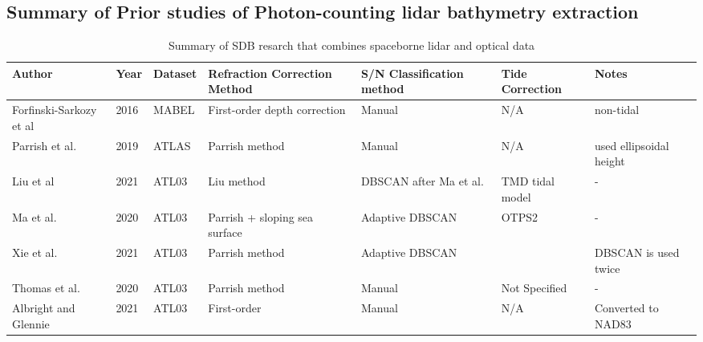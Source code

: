 \subsection{Summary of Prior studies of Photon-counting lidar bathymetry extraction}
\begin{landscape}
      \begin{table}
            \caption{Summary of SDB resarch that combines spaceborne lidar and optical data}
            \begin{tabular}{lllp{3cm}p{3cm}ll}
                  \midrule
                  Author                                               & Year & Dataset & Refraction Correction Method  & S/N Classification method      & Tide Correction & Notes                        \\
                  \hline
                  Forfinski-Sarkozy et al \cite{Forfinski-Sarkozi2016} & 2016 & MABEL   & First-order depth correction  & Manual                         & N/A             & non-tidal                    \\
                  Parrish et al. \cite{Parrish2019}                    & 2019 & ATLAS   & Parrish method                & Manual                         & N/A             & used  ellipsoidal height     \\
                  Liu et al \cite{Liu2021}                             & 2021 & ATL03   & Liu method                    & DBSCAN after Ma et al.         & TMD tidal model & -                            \\
                  Ma et al.  \cite{Ma2020}                             & 2020 & ATL03   & Parrish + sloping sea surface & Adaptive DBSCAN                & OTPS2           & -                            \\
                  Xie et al. \cite{Xie2021}                            & 2021 & ATL03   & Parrish method                & Adaptive DBSCAN                &                 & DBSCAN  is used twice        \\
                  Thomas et al. \cite{Thomas2021d}                     & 2020 & ATL03   & Parrish method                & Manual                         & Not Specified   & -                            \\
                  Albright and Glennie \cite{Albright2021}             & 2021 & ATL03   & First-order                   & Manual                         & N/A             & Converted to NAD83           \\

\end{tabular}
\end{table}
\end{landscape}
